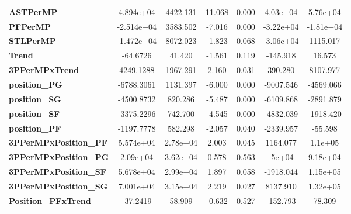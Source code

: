 \begin{center}
\begin{tabular}{lcccccc}
\textbf{ASTPerMP}                   &    4.894e+04  &     4422.131     &    11.068  &         0.000        &     4.03e+04    &     5.76e+04     \\
\textbf{PFPerMP}                    &   -2.514e+04  &     3583.502     &    -7.016  &         0.000        &    -3.22e+04    &    -1.81e+04     \\
\textbf{STLPerMP}                   &   -1.472e+04  &     8072.023     &    -1.823  &         0.068        &    -3.06e+04    &     1115.017     \\
\textbf{Trend}                      &     -64.6726  &       41.420     &    -1.561  &         0.119        &     -145.918    &       16.573     \\
\textbf{3PPerMPxTrend}              &    4249.1288  &     1967.291     &     2.160  &         0.031        &      390.280    &     8107.977     \\
\textbf{position\_PG}               &   -6788.3061  &     1131.397     &    -6.000  &         0.000        &    -9007.546    &    -4569.066     \\
\textbf{position\_SG}               &   -4500.8732  &      820.286     &    -5.487  &         0.000        &    -6109.868    &    -2891.879     \\
\textbf{position\_SF}               &   -3375.2296  &      742.700     &    -4.545  &         0.000        &    -4832.039    &    -1918.420     \\
\textbf{position\_PF}               &   -1197.7778  &      582.298     &    -2.057  &         0.040        &    -2339.957    &      -55.598     \\
\textbf{3PPerMPxPosition\_PF}       &    5.574e+04  &     2.78e+04     &     2.003  &         0.045        &     1164.077    &      1.1e+05     \\
\textbf{3PPerMPxPosition\_PG}       &     2.09e+04  &     3.62e+04     &     0.578  &         0.563        &       -5e+04    &     9.18e+04     \\
\textbf{3PPerMPxPosition\_SF}       &    5.678e+04  &     2.99e+04     &     1.897  &         0.058        &    -1918.044    &     1.15e+05     \\
\textbf{3PPerMPxPosition\_SG}       &    7.001e+04  &     3.15e+04     &     2.219  &         0.027        &     8137.910    &     1.32e+05     \\
\textbf{Position\_PFxTrend}         &     -37.2419  &       58.909     &    -0.632  &         0.527        &     -152.793    &       78.309     \\

\end{tabular}
\end{center}
